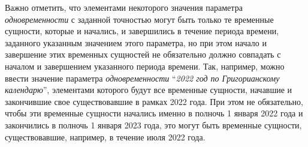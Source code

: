 Важно отметить, что элементами некоторого значения параметра \textit{одновременности} с заданной точностью могут быть только те временные сущности, которые и начались, и завершились в течение периода времени, заданного указанным значением этого параметра, но при этом начало и завершение этих временных сущностей не обязательно должно совпадать с началом и завершением указанного периода времени. Так, например, можно ввести значение параметра \textit{одновременности} ``\textit{2022 год по Григорианскому календарю}'', элементами которого будут все временные сущности, начавшие и закончившие свое существовавшие в рамках 2022 года. При этом не обязательно, чтобы эти временные сущности начались именно в полночь 1 января 2022 года и закончились в полночь 1 января 2023 года, это могут быть временные сущности, существовавшие, например, в течение июля 2022 года.
		
